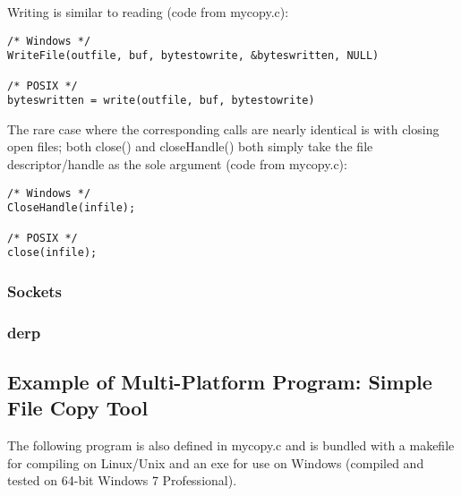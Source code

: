 \documentclass[letterpaper,10pt,fleqn]{article}
\numberwithin{equation}{section}
\begin{document}
Writing is similar to reading (code from mycopy.c):
\begin{verbatim}
/* Windows */
WriteFile(outfile, buf, bytestowrite, &byteswritten, NULL)

/* POSIX */
byteswritten = write(outfile, buf, bytestowrite)
\end{verbatim}

The rare case where the corresponding calls are nearly identical is with closing open files; both close() and closeHandle() both simply take the file descriptor/handle as the sole argument (code from mycopy.c):
\begin{verbatim}
/* Windows */
CloseHandle(infile);

/* POSIX */
close(infile);
\end{verbatim}

\subsubsection*{Sockets}

\subsubsection*{derp}

\subsection*{Example of Multi-Platform Program: Simple File Copy Tool}

The following program is also defined in mycopy.c and is bundled with a makefile for compiling on Linux/Unix and an exe for use on Windows (compiled and tested on 64-bit Windows 7 Professional).
\end{document}
